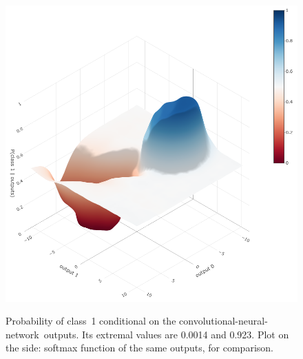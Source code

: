 \documentclass[\ifafour a4paper,12pt,\else a5paper,10pt,\fi%
onecolumn,oneside,article,%
british%
]{memoir}
\theoremstyle{remark}
\theoremstyle{innote}
\renewcommand*{\|}[1][]{\nonscript\:#1\vert\nonscript\:\mathopen{}}
\newcommand*{\cnn}{convolutional-neural-network}
\begin{document}
\begin{figure}[!t]
  \centering
\includegraphics[width=\linewidth]{transducer_surface_CNN_crop.png}\\[4em]%
\parbox[b]{0.63\linewidth}{\caption{Probability of class~1 conditional on the \cnn\ outputs. Its extremal values are 0.0014 and 0.923. Plot on the side: softmax function of the same outputs, for comparison.\label{fig:prob_curve_CNN}}}\hfill%

\end{figure}
\end{document}
